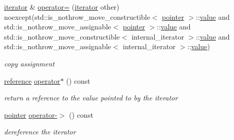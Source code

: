 \begin{DoxyCompactItemize}
\hyperlink{classnlohmann_1_1basic__json_1_1iterator}{iterator} \& \hyperlink{classnlohmann_1_1basic__json_1_1iterator_a51b0ed345317cfd1b2386f481d774477}{operator=} (\hyperlink{classnlohmann_1_1basic__json_1_1iterator}{iterator} other) noexcept(std\+::is\+\_\+nothrow\+\_\+move\+\_\+constructible$<$ \hyperlink{classnlohmann_1_1basic__json_1_1const__iterator_a1da96fc3054d547e7706d3a2f073f389}{pointer} $>$\+::\hyperlink{classnlohmann_1_1basic__json_1_1iterator_ac688806417f3b4e17c4eb1b661b522f1}{value} and std\+::is\+\_\+nothrow\+\_\+move\+\_\+assignable$<$ \hyperlink{classnlohmann_1_1basic__json_1_1const__iterator_a1da96fc3054d547e7706d3a2f073f389}{pointer} $>$\+::\hyperlink{classnlohmann_1_1basic__json_1_1iterator_ac688806417f3b4e17c4eb1b661b522f1}{value} and std\+::is\+\_\+nothrow\+\_\+move\+\_\+constructible$<$ internal\+\_\+iterator $>$\+::\hyperlink{classnlohmann_1_1basic__json_1_1iterator_ac688806417f3b4e17c4eb1b661b522f1}{value} and std\+::is\+\_\+nothrow\+\_\+move\+\_\+assignable$<$ internal\+\_\+iterator $>$\+::\hyperlink{classnlohmann_1_1basic__json_1_1iterator_ac688806417f3b4e17c4eb1b661b522f1}{value})
\begin{DoxyCompactList}\small\item\em copy assignment \end{DoxyCompactList}\item 
\hypertarget{classnlohmann_1_1basic__json_1_1iterator_a1af28ba60302eb48edf4fdbc88e75903}{}\label{classnlohmann_1_1basic__json_1_1iterator_a1af28ba60302eb48edf4fdbc88e75903} 
\hyperlink{classnlohmann_1_1basic__json_1_1const__iterator_aefd248cac6493eed1e6ff53ba6a63eb2}{reference} \hyperlink{classnlohmann_1_1basic__json_1_1iterator_a1af28ba60302eb48edf4fdbc88e75903}{operator$\ast$} () const
\begin{DoxyCompactList}\small\item\em return a reference to the value pointed to by the iterator \end{DoxyCompactList}\item 
\hypertarget{classnlohmann_1_1basic__json_1_1iterator_a12c7f8236ffa08a5dd27cbd9888b74be}{}\label{classnlohmann_1_1basic__json_1_1iterator_a12c7f8236ffa08a5dd27cbd9888b74be} 
\hyperlink{classnlohmann_1_1basic__json_1_1const__iterator_a1da96fc3054d547e7706d3a2f073f389}{pointer} \hyperlink{classnlohmann_1_1basic__json_1_1iterator_a12c7f8236ffa08a5dd27cbd9888b74be}{operator-\/$>$} () const
\begin{DoxyCompactList}\small\item\em dereference the iterator \end{DoxyCompactList}\item 

\end{DoxyCompactItemize}
